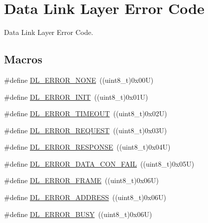 \hypertarget{group___d_l___error___code}{}\section{Data Link Layer Error Code}
\label{group___d_l___error___code}


Data Link Layer Error Code.  


\subsection*{Macros}
\begin{DoxyCompactItemize}
\item 
\#define \hyperlink{group___d_l___error___code_ga0916a814c19b6fef4ca1a90731bf5d01}{D\+L\+\_\+\+E\+R\+R\+O\+R\+\_\+\+N\+O\+NE}~((uint8\+\_\+t)0x00\+U)
\item 
\#define \hyperlink{group___d_l___error___code_ga1cc60f560e52266c38bdd49e2748d498}{D\+L\+\_\+\+E\+R\+R\+O\+R\+\_\+\+I\+N\+IT}~((uint8\+\_\+t)0x01\+U)
\item 
\#define \hyperlink{group___d_l___error___code_gaa75de5faaf914c3a1217429c157c8be7}{D\+L\+\_\+\+E\+R\+R\+O\+R\+\_\+\+T\+I\+M\+E\+O\+UT}~((uint8\+\_\+t)0x02\+U)
\item 
\#define \hyperlink{group___d_l___error___code_gabad6a7bb56b201b473c7dd9c5eeec0b8}{D\+L\+\_\+\+E\+R\+R\+O\+R\+\_\+\+R\+E\+Q\+U\+E\+ST}~((uint8\+\_\+t)0x03\+U)
\item 
\#define \hyperlink{group___d_l___error___code_ga8e9c3a3595a98bbc1d3a46262a93303b}{D\+L\+\_\+\+E\+R\+R\+O\+R\+\_\+\+R\+E\+S\+P\+O\+N\+SE}~((uint8\+\_\+t)0x04\+U)
\item 
\#define \hyperlink{group___d_l___error___code_ga6b7a72bc1d8edbfbf780b63044c92322}{D\+L\+\_\+\+E\+R\+R\+O\+R\+\_\+\+D\+A\+T\+A\+\_\+\+C\+O\+N\+\_\+\+F\+A\+IL}~((uint8\+\_\+t)0x05\+U)
\item 
\#define \hyperlink{group___d_l___error___code_ga8da96c5729a35fb36dcc8860dbec435c}{D\+L\+\_\+\+E\+R\+R\+O\+R\+\_\+\+F\+R\+A\+ME}~((uint8\+\_\+t)0x06\+U)
\item 
\#define \hyperlink{group___d_l___error___code_ga0e70865893433ded70ea9e4b61e89170}{D\+L\+\_\+\+E\+R\+R\+O\+R\+\_\+\+A\+D\+D\+R\+E\+SS}~((uint8\+\_\+t)0x06\+U)
\item 
\#define \hyperlink{group___d_l___error___code_ga08ff3d2316d590fbd32a30106aefee2b}{D\+L\+\_\+\+E\+R\+R\+O\+R\+\_\+\+B\+U\+SY}~((uint8\+\_\+t)0x06\+U)
\end{DoxyCompactItemize}


